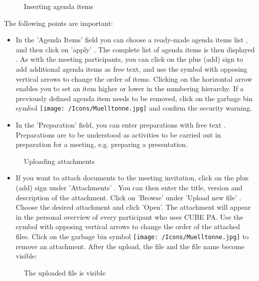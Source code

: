 \begin{figure}[H]
\caption{Inserting agenda items}
\end{figure}

The following points are important:

\begin{itemize}
\item 
In the 'Agenda Items' field you can choose a ready-made agenda items list , and then click on 'apply' . The complete list of agenda items is then displayed . As with the meeting participants, you can click on the plus (add) sign  to add additional agenda items as free text, and use the symbol with opposing vertical arrows  to change the order of items. Clicking on the horizontal arrow  enables you to set an item higher or lower in the numbering hierarchy. If a previously defined agenda item needs to be removed, click on the garbage bin symbol \texttt{[image: /Icons/Muelltonne.jpg]}  and confirm the security warning.
\item 
In the 'Preparation' field, you can enter preparations with free text . Preparations are to be understood as activities to be carried out in preparation for a meeting, e.g. preparing a presentation.
\end{itemize}

\begin{figure}[H]
\caption{Uploading attachments}
\end{figure}

\begin{itemize}
\item 
If you want to attach documents to the meeting invitation, click on the plus (add) sign under 'Attachments' . You can then enter the title, version and description of the attachment. Click on 'Browse' under 'Upload new file' . Choose the desired attachment and click 'Open'. The attachment will appear in the personal overview of every participant who uses CUBE PA. Use the symbol with opposing vertical arrows to change the order of the attached files. Click on the garbage bin symbol \texttt{[image: /Icons/Muelltonne.jpg]} to remove an attachment. After the upload, the file and the file name become visible:
\end{itemize}

\begin{figure}[H]
\caption{The uploaded file is visible}
\end{figure}

